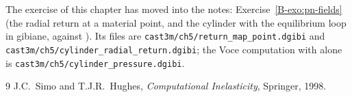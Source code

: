 
The exercise of this chapter has moved into the notes: Exercise~\ref{B-exo:pn-fields}
(the radial return at a material point, and the cylinder with the equilibrium
loop in gibiane, against ). Its files are
\texttt{cast3m/ch5/return\_map\_point.dgibi} and
\texttt{cast3m/ch5/cylinder\_radial\_return.dgibi}; the Voce computation with
 alone is \texttt{cast3m/ch5/cylinder\_pressure.dgibi}.

\begin{chapterbib}{9}
 J.C.~Simo and T.J.R.~Hughes, \emph{Computational
  Inelasticity}, Springer, 1998.
\end{chapterbib}
